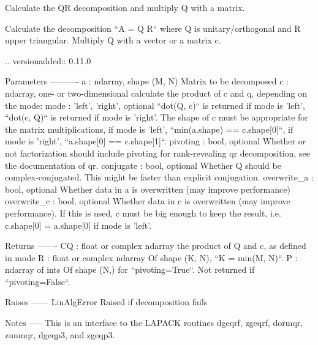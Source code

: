 \begin{DoxyVerb}Calculate the QR decomposition and multiply Q with a matrix.

Calculate the decomposition ``A = Q R`` where Q is unitary/orthogonal
and R upper triangular. Multiply Q with a vector or a matrix c.

.. versionadded:: 0.11.0

Parameters
----------
a : ndarray, shape (M, N)
    Matrix to be decomposed
c : ndarray, one- or two-dimensional
    calculate the product of c and q, depending on the mode:
mode : {'left', 'right'}, optional
    ``dot(Q, c)`` is returned if mode is 'left',
    ``dot(c, Q)`` is returned if mode is 'right'.
    The shape of c must be appropriate for the matrix multiplications,
    if mode is 'left', ``min(a.shape) == c.shape[0]``,
    if mode is 'right', ``a.shape[0] == c.shape[1]``.
pivoting : bool, optional
    Whether or not factorization should include pivoting for rank-revealing
    qr decomposition, see the documentation of qr.
conjugate : bool, optional
    Whether Q should be complex-conjugated. This might be faster
    than explicit conjugation.
overwrite_a : bool, optional
    Whether data in a is overwritten (may improve performance)
overwrite_c : bool, optional
    Whether data in c is overwritten (may improve performance).
    If this is used, c must be big enough to keep the result,
    i.e. c.shape[0] = a.shape[0] if mode is 'left'.


Returns
-------
CQ : float or complex ndarray
    the product of Q and c, as defined in mode
R : float or complex ndarray
    Of shape (K, N), ``K = min(M, N)``.
P : ndarray of ints
    Of shape (N,) for ``pivoting=True``.
    Not returned if ``pivoting=False``.

Raises
------
LinAlgError
    Raised if decomposition fails

Notes
-----
This is an interface to the LAPACK routines dgeqrf, zgeqrf,
dormqr, zunmqr, dgeqp3, and zgeqp3.\end{DoxyVerb}
 \hypertarget{namespacescipy_1_1linalg_1_1decomp__qr_a508d88a8287c253cab142b376283ccef}{}
